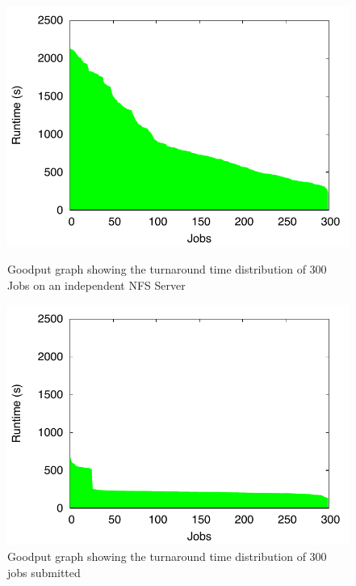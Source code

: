 \documentclass[ms,electronic,double]{nuthesis}
\begin{document}
\begin{figure}[htbp!]

\begin{center}
\includegraphics{images/nfs_tusker_goodput}
\caption{Goodput graph showing the turnaround time distribution of 300 Jobs on an independent NFS Server}
\label{fig:nfs_tusker_goodput}
\end{center}


\begin{center}
\includegraphics{images/nfs_coscheduler_tusker_goodput}
\caption{Goodput graph showing the turnaround time distribution of 300 jobs submitted}
\label{fig:nfs_coscheduler_tusker_goodput}
\end{center}


\end{figure}
\FloatBarrier
\end{document}
